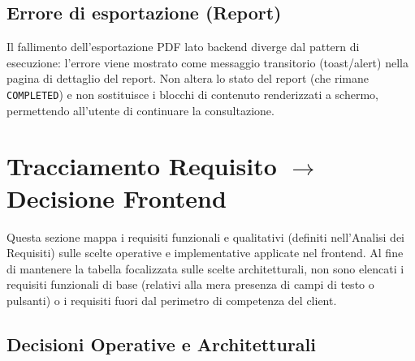 \documentclass[11pt,a4paper]{article}
\begin{document}
\subsection{Errore di esportazione (Report)}

Il fallimento dell'esportazione PDF lato backend diverge dal pattern di esecuzione: l'errore viene mostrato come messaggio transitorio (toast/alert) nella pagina di dettaglio del report. Non altera lo stato del report (che rimane \texttt{COMPLETED}) e non sostituisce i blocchi di contenuto renderizzati a schermo, permettendo all'utente di continuare la consultazione.

\section{Tracciamento Requisito $\to$ Decisione Frontend}
\label{sec:fe-tracciamento}

Questa sezione mappa i requisiti funzionali e qualitativi (definiti nell'Analisi dei Requisiti) sulle scelte operative e implementative applicate nel frontend. Al fine di mantenere la tabella focalizzata sulle scelte architetturali, non sono elencati i requisiti funzionali di base (relativi alla mera presenza di campi di testo o pulsanti) o i requisiti fuori dal perimetro di competenza del client.

\subsection{Decisioni Operative e Architetturali}
\end{document}
